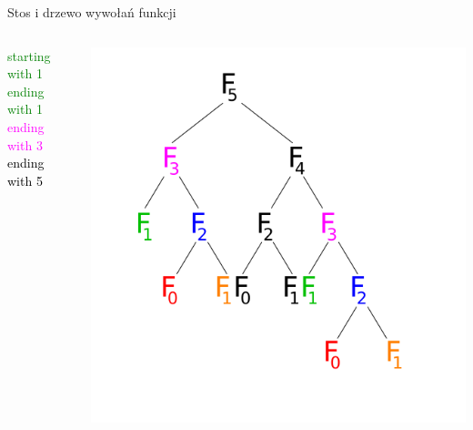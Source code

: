 \begin{frame}{Stos i drzewo wywołań funkcji}
\begin{columns}
\begin{column}{0.25\textwidth}
            \textcolor{green}{starting with 1}\\
            \textcolor{green}{ending with 1}\\
            \textcolor{magenta}{ending with 3}\\
            \textcolor{black}{ending with 5}\\
        \end{column}
        \begin{column}{0.5\textwidth}
            \includegraphics[width=\textwidth]{graphics/recursion/fibonacci_F4.png}
        \end{column}
    \end{columns}
\end{frame}

